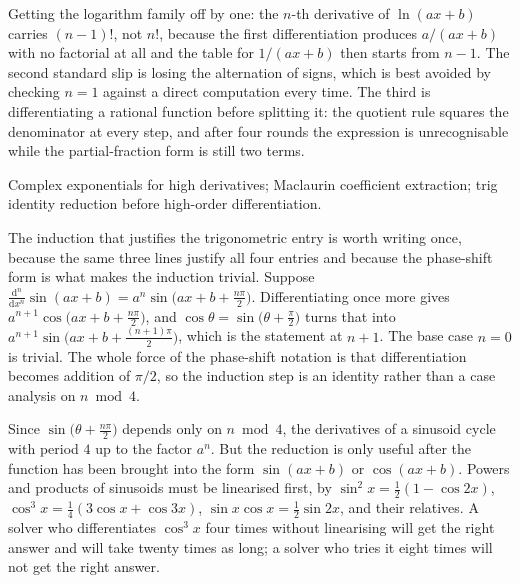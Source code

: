 \begin{trap}
Getting the logarithm family off by one: the $n$-th derivative of $\ln(ax+b)$ carries $(n-1)!$, not $n!$, because the first differentiation produces $a/(ax+b)$ with no factorial at all and the table for $1/(ax+b)$ then starts from $n-1$. The second standard slip is losing the alternation of signs, which is best avoided by checking $n=1$ against a direct computation every time. The third is differentiating a rational function before splitting it: the quotient rule squares the denominator at every step, and after four rounds the expression is unrecognisable while the partial-fraction form is still two terms.
\end{trap}

\begin{seealsob}Complex exponentials for high derivatives; Maclaurin coefficient extraction; trig identity reduction before high-order differentiation.\end{seealsob}

The induction that justifies the trigonometric entry is worth writing once, because the same three lines justify all four entries and because the phase-shift form is what makes the induction trivial. Suppose $\frac{\mathrm{d}^{n}}{\mathrm{d}x^{n}}\sin(ax+b)=a^{n}\sin\bigl(ax+b+\tfrac{n\pi}{2}\bigr)$. Differentiating once more gives $a^{n+1}\cos\bigl(ax+b+\tfrac{n\pi}{2}\bigr)$, and $\cos\theta=\sin\bigl(\theta+\tfrac\pi2\bigr)$ turns that into $a^{n+1}\sin\bigl(ax+b+\tfrac{(n+1)\pi}{2}\bigr)$, which is the statement at $n+1$. The base case $n=0$ is trivial. The whole force of the phase-shift notation is that differentiation becomes addition of $\pi/2$, so the induction step is an identity rather than a case analysis on $n\bmod4$.

\begin{keynote}
Since $\sin\bigl(\theta+\tfrac{n\pi}{2}\bigr)$ depends only on $n\bmod4$, the derivatives of a sinusoid cycle with period $4$ up to the factor $a^{n}$. But the reduction is only useful after the function has been brought into the form $\sin(ax+b)$ or $\cos(ax+b)$. Powers and products of sinusoids must be linearised first, by $\sin^{2}x=\tfrac12(1-\cos2x)$, $\cos^{3}x=\tfrac14(3\cos x+\cos3x)$, $\sin x\cos x=\tfrac12\sin2x$, and their relatives. A solver who differentiates $\cos^{3}x$ four times without linearising will get the right answer and will take twenty times as long; a solver who tries it eight times will not get the right answer.
\end{keynote}

